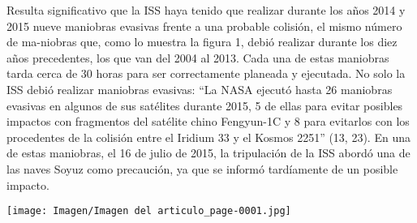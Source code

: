 \documentclass[12pt,letterpaper]{article}
\newenvironment{Figura}
  {\par\medskip\noindent\minipage{\linewidth}}
  {\endminipage\par\medskip}
\begin{document}
\begin{multicols}{2}
\noindent Resulta significativo que la ISS haya tenido que realizar durante los años 2014 y 2015 nueve maniobras evasivas frente a una probable colisión, el mismo número de ma-niobras que, como lo muestra la figura 1, debió realizar durante los diez años precedentes, los que van del 2004 al 2013. Cada una de estas maniobras tarda cerca de 30 horas para ser correctamente planeada y ejecutada. No solo la ISS debió realizar maniobras evasivas: “La NASA ejecutó hasta 26 maniobras evasivas en algunos de sus satélites  durante  2015,  5  de  ellas  para  evitar  posibles  impactos con fragmentos del satélite chino Fengyun-1C y 8 para evitarlos con los procedentes de la colisión entre el  Iridium  33  y  el  Kosmos  2251”  (13,  23).  En  una  de  estas maniobras, el 16 de julio de 2015, la tripulación de la ISS abordó una de las naves Soyuz como precaución, ya que se informó tardíamente de un posible impacto.

\begin{Figura}
    \centering
    \texttt{[image: Imagen/Imagen del articulo\_page-0001.jpg]}
\end{Figura}

\end{multicols}

\newpage 
\end{document}
